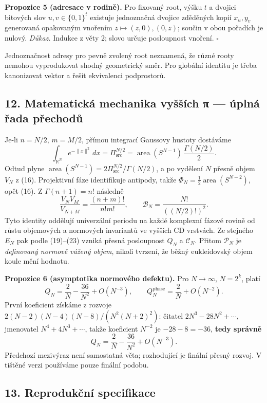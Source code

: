 \documentclass[
  10pt,
]{article}
\begin{document}
\textbf{Propozice 5 (adresace v rodině).} Pro fixovaný root, výšku \(t\)
a dvojici bitových slov \(u,v\in\{0,1\}^t\) existuje jednoznačná dvojice
zděděných kopií \(x_u,y_v\) generovaná opakovaným vnořením
\(z\mapsto(z,0),(0,z)\); součin v obou pořadích je nulový. \emph{Důkaz.}
Indukce z věty 2; slovo určuje posloupnost vnoření. \(\square\)

Jednoznačnost adresy pro pevně zvolený root neznamená, že různé rooty
nemohou vyprodukovat shodný geometrický směr. Pro globální identitu je
třeba kanonizovat vektor a řešit ekvivalenci podprostorů.

\subsection{12. Matematická mechanika vyšších π --- úplná řada
přechodů}\label{matematickuxe1-mechanika-vyux161ux161uxedch-ux3c0-uxfaplnuxe1-ux159ada-pux159echodux16f}

Je-li \(n=N/2\), \(m=M/2\), přímou integrací Gaussovy hustoty dostáváme
\[
\int_{\mathbb R^N}e^{-\|x\|^2}\,dx=\Pi_{\mathrm{src}}^{N/2}
=\operatorname{area}(S^{N-1})\,\frac{\Gamma(N/2)}2.
\] Odtud plyne
\(\operatorname{area}(S^{N-1})=2\Pi_{\mathrm{src}}^{N/2}/\Gamma(N/2)\),
a po vydělení \(N\) přesně objem \(V_N\) z (16). Projektivní fáze
identifikuje antipody, takže
\(\Phi_N=\tfrac12\operatorname{area}(S^{N-2})\), opět (16). Z
\(\Gamma(n+1)=n!\) následně \[
\frac{V_NV_M}{V_{N+M}}=\frac{(n+m)!}{n!m!},\qquad
\mathcal B_N=\frac{N!}{((N/2)!)^2}.
\] Tyto identity oddělují univerzální periodu na každé komplexní fázové
rovině od růstu objemových a normových invariantů ve vyšších CD
vrstvách. Ze stejného \(E_N\) pak podle (19)--(23) vzniká přesná
posloupnost \(Q_N\) a \(\mathcal C_N\). Přitom \(\mathcal P_N\) je
\emph{definovaný normově vážený objem}, nikoli tvrzení, že běžný
eukleidovský objem koule mění hodnotu.

\textbf{Propozice 6 (asymptotika normového defektu).} Pro
\(N\to\infty\), \(N=2^k\), platí \[
Q_N=\frac2N-\frac{36}{N^2}+O(N^{-3}),\qquad
Q_N^{\mathrm{phase}}=\frac2N+O(N^{-2}).
\] První koeficient získáme z rozvoje \(2(N-2)(N-4)(N-8)/(N^2(N+2)^2)\):
čitatel \(2N^3-28N^2+\cdots\), jmenovatel \(N^4+4N^3+\cdots\), takže
koeficient \(N^{-2}\) je \(-28-8=-36\), \textbf{tedy správně} \[
\boxed{Q_N=\frac2N-\frac{36}{N^2}+O(N^{-3})}.
\] Předchozí mezivýraz není samostatná věta; rozhodující je finální
přesný rozvoj. V tištěné verzi používáme pouze finální podobu.

\subsection{13. Reprodukční
specifikace}\label{reprodukux10dnuxed-specifikace}
\end{document}
